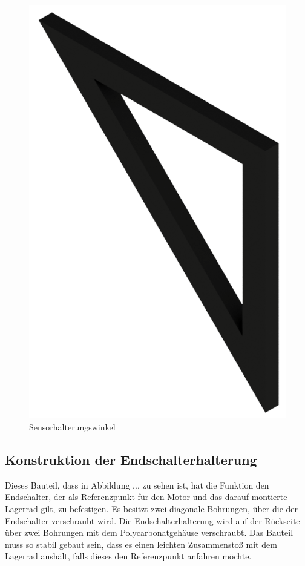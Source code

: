 \begin{figure}
    \centering
    \includegraphics[scale=0.5,page=1]{fig/mech/WinkelSensor.png}
    \caption{Sensorhalterungswinkel}
\end{figure}

\subsection{Konstruktion der Endschalterhalterung}
Dieses Bauteil, dass in Abbildung ... zu sehen ist, hat die Funktion den Endschalter, der als Referenzpunkt für den Motor und das darauf montierte
Lagerrad gilt, zu befestigen. Es besitzt zwei diagonale Bohrungen, über die der Endschalter verschraubt wird.
Die Endschalterhalterung wird auf der Rückseite über zwei Bohrungen mit dem Polycarbonatgehäuse verschraubt.
Das Bauteil muss so stabil gebaut sein, dass es einen leichten Zusammenstoß mit dem Lagerrad aushält, falls dieses
den Referenzpunkt anfahren möchte.

